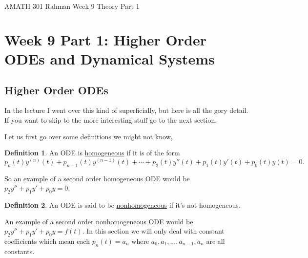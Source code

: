 \documentclass[reqno]{amsart}
\theoremstyle{definition}
\newtheorem{definition}{Definition}
\begin{document}
\begin{flushleft}
{\sc \Large AMATH 301 Rahman} \hfill Week 9 Theory Part 1
\bigskip
\end{flushleft}

\newcommand{\R}{\mathbb{R}}
\newcommand{\N}{\mathbb{N}}
\newcommand{\Z}{\mathbb{Z}}
\newcommand{\Q}{\mathbb{Q}}
\renewcommand{\CancelColor}{\color{red}}
\newcommand{\?}{\stackrel{?}{=}}
\renewcommand{\varphi}{\phi}
\newcommand{\card}{\text{Card}}
\newcommand{\bigzero}{\text{\Huge 0}}
\newcommand{\curvearrowdown}{{\color{red}\rotatebox{90}{$\curvearrowleft$}}}
\newcommand{\curvearrowup}{{\color{red}\rotatebox{90}{$\curvearrowright$}}}



\section*{Week 9 Part 1:  Higher Order ODEs and Dynamical Systems}

\subsection*{Higher Order ODEs}

In the lecture I went over this kind of superficially, but here is all the gory detail.  If you want to skip to the more interesting stuff go to the next section.

Let us first go over some definitions we might not know,

\begin{definition}
An ODE is \underline{homogeneous} if it is of the form
\begin{equation}
p_n(t)y^{(n)}(t) + p_{n-1}(t)y^{(n-1)}(t) + \cdots + p_2(t)y''(t) + p_1(t)y'(t) + p_0(t)y(t) = 0.
\label{ODE}
\end{equation}
\end{definition}

So an example of a second order homogeneous ODE would be\\ $p_2y'' + p_1y' + p_0y = 0$.

\begin{definition}
An ODE is said to be \underline{nonhomogeneous} if it's not homogeneous.
\end{definition}

An example of a second order nonhomogeneous ODE would be $p_2y'' + p_1y' + p_0y = f(t)$.
In this section we will only deal with constant coefficients which mean each $p_n(t) = a_n$ where
$a_0, a_1, \ldots , a_{n-1}, a_n$ are all constants.
\end{document}
